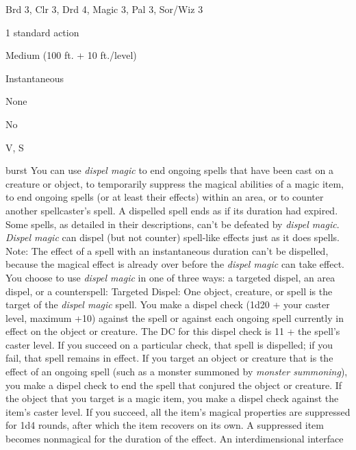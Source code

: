 
\begin{description*}
\item[Level:] Brd 3, Clr 3, Drd 4, Magic 3, Pal 3, Sor/Wiz 3
\item[Casting Time:] 1 standard action
\item[Range:] Medium (100 ft. + 10 ft./level)
\item[Duration:] Instantaneous
\item[Saving Throw:] None
\item[Spell Resistance:] No
\item[Components:] V, S
\end{description*}

burst
You can use \textit{dispel magic} to end ongoing spells that have been cast on
a creature or object, to temporarily suppress the magical abilities of a magic
item, to end ongoing spells (or at least their effects) within an area, or to counter
another spellcaster's spell. A dispelled spell ends as if its duration had expired.
Some spells, as detailed in their descriptions, can't be defeated by \textit{dispel
magic}. \textit{Dispel magic} can dispel (but not counter) spell-like effects just
as it does spells.
Note: The effect of a spell with an instantaneous duration can't be dispelled,
because the magical effect is already over before the \textit{dispel magic} can
take effect.
You choose to use \textit{dispel magic} in one of three ways: a targeted dispel,
an area dispel, or a counterspell:
Targeted Dispel: One object, creature, or spell is the target of the \textit{dispel
magic} spell. You make a dispel check (1d20 + your caster level, maximum +10) against
the spell or against each ongoing spell currently in effect on the object or creature.
The DC for this dispel check is 11 + the spell's caster level. If you succeed on
a particular check, that spell is dispelled; if you fail, that spell remains in
effect.
If you target an object or creature that is the effect of an ongoing spell (such
as a monster summoned by \textit{monster summoning}), you make a dispel check to
end the spell that conjured the object or creature.
If the object that you target is a magic item, you make a dispel check against
the item's caster level. If you succeed, all the item's magical properties are
suppressed for 1d4 rounds, after which the item recovers on its own. A suppressed
item becomes nonmagical for the duration of the effect. An interdimensional interface
